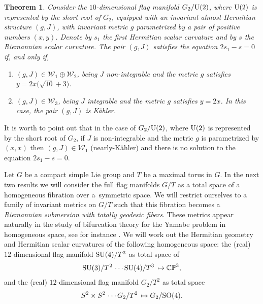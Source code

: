 \documentclass[pdftex]{sigma}%
\numberwithin{equation}{section}
\newtheorem{Theorem}{Theorem}[section]
\begin{document}
\begin{Theorem}
Consider the $10$-dimensional flag manifold $G_2/{\rm U}(2)$, where ${\rm U}(2)$ is represented by the short root of $G_2$, equipped with an invariant almost Hermitian structure $(g,J)$, with invariant metric $g$ parametrized by a pair of positive numbers $(x,y)$. Denote by $s_1$ the first Hermitian scalar curvature and by $s$ the Riemannian scalar curvature. The pair $(g,J)$ satisfies the equation $2s_1-s=0$ if, and only if,
\begin{enumerate}\itemsep=0pt
\item[$1.$] $(g,J) \in\mathcal{W}_{1}\oplus \mathcal{W}_{2}$, being $J$ non-integrable and the metric $g$ satisfies $y=2x\big(\sqrt{10} +3\big)$.
\item[$2.$] $(g,J)\in\mathcal{W}_{3}$, being $J$ integrable and the metric $g$ satisfies $y=2x$. In this case, the pair $(g,J)$ is K\"ahler.
\end{enumerate}
\end{Theorem}
\begin{Remark}
It is worth to point out that in the case of $G_2/{\rm U}(2)$, where ${\rm U}(2)$ is represented by the short root of $G_2$, if $J$ is non-integrable and the metric $g$ is parametrized by $(x,x)$ then $(g,J)\in \mathcal{W}_1$ (nearly-K\"ahler) and there is no solution to the equation $2s_1-s=0$.
\end{Remark}

Let $G$ be a compact simple Lie group and $T$ be a maximal torus in $G$. In the next two results we will consider the full flag manifolds $G/T$ as a total space of a homogeneous fibration over a~symmetric space. We will restrict ourselves to a family of invariant metrics on $G/T$ such that this fibration becomes a {\it Riemannian submersion with totally geodesic fibers}. These metrics appear naturally in the study of bifurcation theory for the Yamabe problem in homogeneous space, see for instance \cite{kenerson}. We will work out the Hermitian geometry and Hermitian scalar curvatures of the following homogeneous space: the (real) $12$-dimensional flag manifold ${\rm SU}(4)/T^3$ as total space of
\begin{gather*}
{\rm SU}(3)/T^2 \, \cdots {\rm SU}(4)/T^3 \, \mapsto \mathbb{CP}^3,
\end{gather*}
and the (real) $12$-dimensional flag manifold $G_2/T^2$ as total space
\begin{gather*}
S^2\times S^2 \, \cdots G_2/T^2 \, \mapsto G_2/{\rm SO}(4).
\end{gather*}
\end{document}
